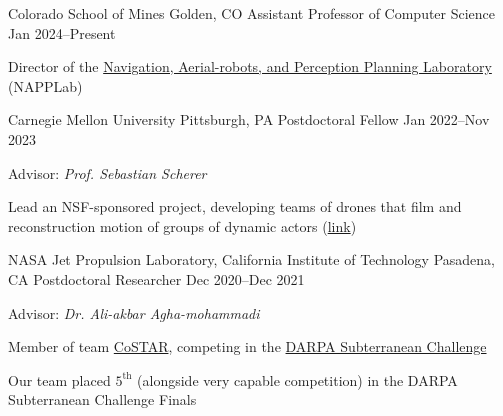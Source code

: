 \vspace{-0.1cm}
\vspace{-0.1cm}

\begin{cventries}
  \cventry
  {Colorado School of Mines}
  {Golden, CO}
  {Assistant Professor of Computer Science}
  {Jan 2024--Present}
  {
    \begin{cvitems}
      \item Director of the
        \href{https://www.napplab.org/}{Navigation, Aerial-robots, and Perception Planning Laboratory}
        (NAPPLab)
    \end{cvitems}
  }
  \cventry
  {Carnegie Mellon University}
  {Pittsburgh, PA}
  {Postdoctoral Fellow}
  {Jan 2022--Nov 2023}
  {
    Advisor: \emph{Prof. Sebastian Scherer}\linebreak
    \begin{cvitems}
    \item Lead an NSF-sponsored project, developing teams of drones that
      film and reconstruction motion of groups of dynamic actors
      (\href{https://theairlab.org/multidrone/}{link})
    \end{cvitems}
  }
  \cventry
  {NASA Jet Propulsion Laboratory, California Institute of Technology}
  {Pasadena, CA}
  {Postdoctoral Researcher}
  {Dec 2020--Dec 2021}
  {
    Advisor: \emph{Dr. Ali-akbar Agha-mohammadi}\linebreak
    \begin{cvitems}
    \item Member of team \href{https://costar.jpl.nasa.gov/}{CoSTAR}, competing in the
      \href{https://www.subtchallenge.com/}{DARPA Subterranean Challenge}
    \item Our team placed $5^\mathrm{th}$ (alongside very capable competition)
      in the DARPA Subterranean Challenge Finals

\end{cvitems}}
\end{cventries}
